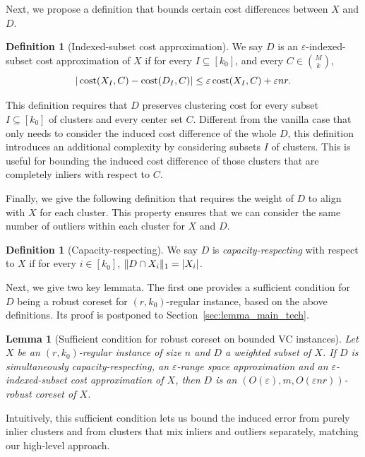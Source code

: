 \documentclass[11pt,letterpaper]{article}
\newtheorem{lemma}[theorem]{Lemma}
\theoremstyle{definition}
\newtheorem{definition}[theorem]{Definition}
\newcommand{\eps}{\varepsilon}
\DeclarePairedDelimiter{\abs}{\lvert}{\rvert}
\DeclarePairedDelimiter{\norm}{\lVert}{\rVert}
\begin{document}
Next, we propose a definition that bounds certain cost differences between $X$ and $D$.

\begin{definition}[Indexed-subset cost approximation] \label{def_subset}
We say $D$ is an $\eps$-indexed-subset cost approximation of $X$ if for every $I\subseteq [k_0]$, and every $C\in \binom{M}{k}$, 
$$
|\cost(X_I,C)-\cost(D_I,C)|\leq \eps \cost(X_I,C)+\eps n r.
$$
\end{definition}

This definition requires that $D$ preserves clustering cost for every subset $I\subseteq [k_0]$ of clusters and every center set $C$.
%
Different from the vanilla case that only needs to consider the induced cost difference of the whole $D$, this definition introduces an additional complexity by considering subsets $I$ of clusters.
%
This is useful for bounding the induced cost difference of those clusters that are completely inliers with respect to $C$.
%

Finally, we give the following definition that requires the weight of $D$ to align with $X$ for each cluster.
This property ensures that we can consider the same number of outliers within each cluster for $X$ and $D$.

\begin{definition}[Capacity-respecting] \label{def_cap}
We say $D$ is \emph{capacity-respecting} with respect to $X$ if for every $i\in [k_0]$, $\norm{D\cap X_i}_1 = \abs{X_i}$.
\end{definition}

Next, we give two key lemmata.
%
The first one provides a sufficient condition for $D$ being a robust coreset for $(r,k_0)$-regular instance, based on the above definitions. Its proof is postponed to Section~\ref{sec:lemma_main_tech}.

\begin{lemma}[Sufficient condition for robust coreset on bounded VC instances] 
\label{lemma_main_tech}
Let $X$ be an $(r,k_0)$-regular instance of size $n$ and $D$ a weighted subset of $X$.
If $D$ is simultaneously capacity-respecting, an $\eps$-range space approximation and an $\eps$-indexed-subset cost approximation of $X$, then $D$ is an $(O(\eps),m,O(\eps n r ))$-robust coreset of $X$.
\end{lemma}

Intuitively, this sufficient condition lets us bound the induced error from purely inlier clusters and from clusters that mix inliers and outliers separately, matching our high-level approach.
%
\end{document}
